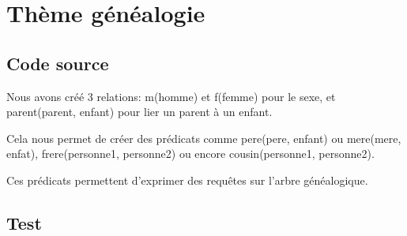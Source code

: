 
\section{Thème généalogie}

    \subsection{Code source}

        

            Nous avons créé 3 relations: {\ttfamily m(homme)} et {\ttfamily f(femme)} pour 
le sexe, et {\ttfamily parent(parent, enfant)} pour lier un parent à un enfant.

Cela nous permet de créer des prédicats comme {\ttfamily pere(pere, enfant)} ou 
{\ttfamily mere(mere, enfat)}, {\ttfamily frere(personne1, personne2)} ou encore 
{\ttfamily cousin(personne1, personne2)}.

Ces prédicats permettent d'exprimer des requêtes sur l'arbre généalogique.

    \subsection{Test}

